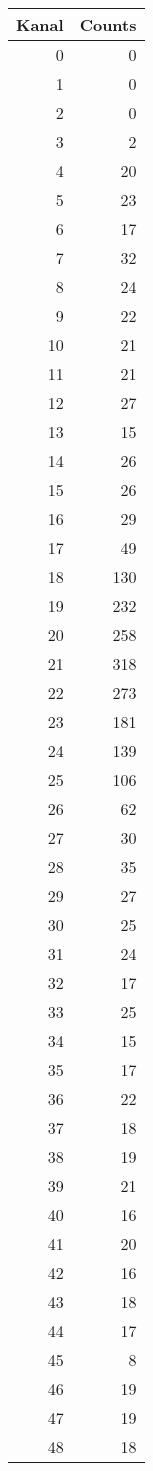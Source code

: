 \begin{tabular}{rr}
\toprule
Kanal & Counts \\
\midrule
0 & 0 \\
1 & 0 \\
2 & 0 \\
3 & 2 \\
4 & 20 \\
5 & 23 \\
6 & 17 \\
7 & 32 \\
8 & 24 \\
9 & 22 \\
10 & 21 \\
11 & 21 \\
12 & 27 \\
13 & 15 \\
14 & 26 \\
15 & 26 \\
16 & 29 \\
17 & 49 \\
18 & 130 \\
19 & 232 \\
20 & 258 \\
21 & 318 \\
22 & 273 \\
23 & 181 \\
24 & 139 \\
25 & 106 \\
26 & 62 \\
27 & 30 \\
28 & 35 \\
29 & 27 \\
30 & 25 \\
31 & 24 \\
32 & 17 \\
33 & 25 \\
34 & 15 \\
35 & 17 \\
36 & 22 \\
37 & 18 \\
38 & 19 \\
39 & 21 \\
40 & 16 \\
41 & 20 \\
42 & 16 \\
43 & 18 \\
44 & 17 \\
45 & 8 \\
46 & 19 \\
47 & 19 \\
48 & 18 \\

\end{tabular}
